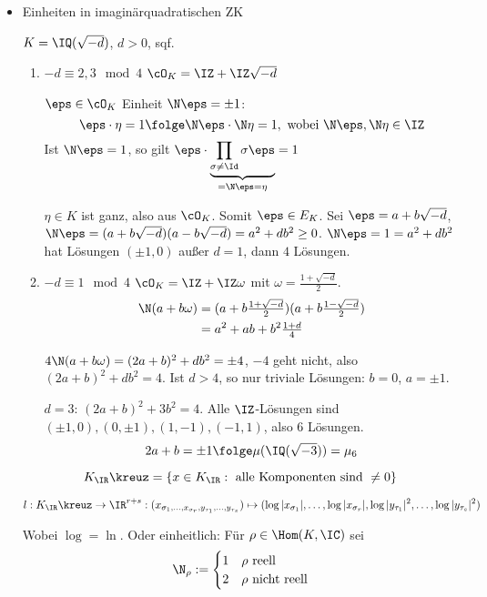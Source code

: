 \begin{Beispiel}
 \begin{itemize}
  \item Einheiten in imaginärquadratischen ZK
  
  $K=\IQ(\sqrt{-d})$, $d>0$, sqf.
  \begin{enumerate}
   \item $-d\equiv 2,3\mod{4}$ \folge $\cO_K=\IZ+\IZ\sqrt{-d}$
   
   $\eps\in\cO_K$ Einheit \gdw $\N\eps=\pm 1$:
   \[\eps\cdot\eta=1 \folge \N\eps\cdot\N\eta=1, \mbox{ wobei } \N\eps,\N\eta\in\IZ \]
   Ist $\N\eps=1$, so gilt $\eps\cdot\underbrace{\prod_{\sigma\neq\Id}\sigma\eps}_{=\N\eps=\eta}=1$
   
   $\eta\in K$ ist ganz, also aus $\cO_K$. Somit $\eps\in E_K$. Sei $\eps=a+b\sqrt{-d}$, $\N\eps=(a+b\sqrt{-d})(a-b\sqrt{-d})=a^2+db^2\geq 0$. $\N\eps=1=a^2+db^2$ hat Lösungen $(\pm1,0)$ außer $d=1$, dann $4$ Lösungen.
   
   \item $-d\equiv 1\mod{4}$ \folge $\cO_K=\IZ+\IZ\omega$ mit $\omega=\frac{1+\sqrt{-d}}{2}$.
   \begin{align*}
    \N(a+b\omega)&=(a+b\tfrac{1+\sqrt{-d}}{2})(a+b\tfrac{1-\sqrt{-d}}{2})\\
    &=a^2+ab+b^2\tfrac{1+d}{4}
   \end{align*}
   
   \folge $4\N(a+b\omega)=(2a+b)^2+db^2=\pm 4$, $-4$ geht nicht, also $(2a+b)^2+db^2= 4$. Ist $d>4$, so nur triviale Lösungen: $b=0$, $a=\pm1$.
   
   $d=3$: $(2a+b)^2+3b^2=4$. Alle $\IZ$-Lösungen sind $(\pm1,0),(0,\pm1),(1,-1),(-1,1)$, also 6 Lösungen.
   \[ 2a+b=\pm 1 \folge \mu(\IQ(\sqrt{-3}))=\mu_6\]
  \end{enumerate}
  
  
  \begin{Definition}
   \[K_\IR\kreuz=\{ x\in K_\IR : \mbox{ alle Komponenten sind }\neq 0\}\]
   
   \[ l: K_\IR\kreuz\rightarrow \IR^{r+s}: (x_{\sigma_1,\ldots,x_{\sigma_r},y_{\tau_1},\ldots,y_{\tau_s}})\mapsto (\log|x_{\sigma_1}|,\ldots,\log|x_{\sigma_r}|, \log|y_{\tau_1}|^2,\ldots,\log|y_{\tau_s}|^2)\]
   
   Wobei $\log=\ln$. Oder einheitlich: Für $\rho\in\Hom(K,\IC)$ sei 
   \[ \N_\rho:=\begin{cases}
                1& \rho\mbox{ reell}\\
                2& \rho\mbox{ nicht reell}
               \end{cases}
\]


\end{Definition}
\end{itemize}
\end{Beispiel}
